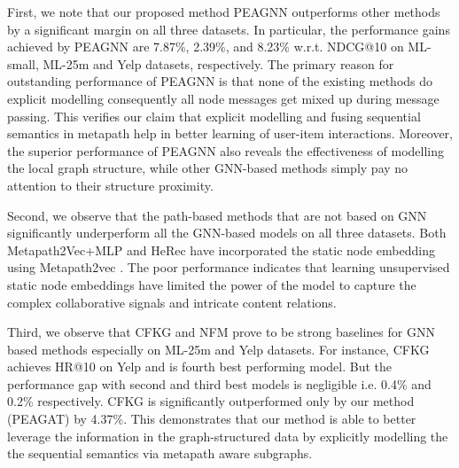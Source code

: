 \documentclass[runningheads, envcountsame, a4paper]{llncs}
\begin{document}
First, we note that our proposed method PEAGNN outperforms other methods by a significant margin on all three datasets.
In particular, the performance gains achieved by PEAGNN are 7.87\%, 2.39\%, and 8.23\% w.r.t. NDCG@10 on ML-small, ML-25m and Yelp datasets, respectively.
The primary reason for outstanding performance of PEAGNN is that
none of the existing methods do explicit modelling consequently all node messages get mixed up during message passing. 
This verifies our claim that explicit modelling and fusing sequential semantics in metapath help in better learning of user-item interactions.
Moreover, the superior performance of PEAGNN also reveals the effectiveness of  modelling the local graph structure, while other GNN-based methods simply pay no attention to their structure proximity.

Second, we observe that the path-based methods that are not based on GNN significantly underperform all the GNN-based models on all three datasets.
Both Metapath2Vec+MLP and HeRec have incorporated the static node embedding using Metapath2vec \cite{dong2017metapath2vec}. 
The poor performance indicates that learning unsupervised static node embeddings have limited the power of the model to capture the complex collaborative signals and intricate content relations.

Third, we observe that CFKG and NFM prove to be strong baselines for GNN based methods especially on ML-25m and Yelp datasets. 
For instance, CFKG achieves  HR@10 on Yelp and is fourth best performing model.
But the performance gap with second and third best models is negligible i.e. 0.4\% and 0.2\% respectively. 
CFKG is significantly outperformed only by our method (PEAGAT) by 4.37\%.
This demonstrates that our method is able to better leverage the  information in the graph-structured data by explicitly modelling the the sequential semantics via metapath aware subgraphs.
\end{document}

